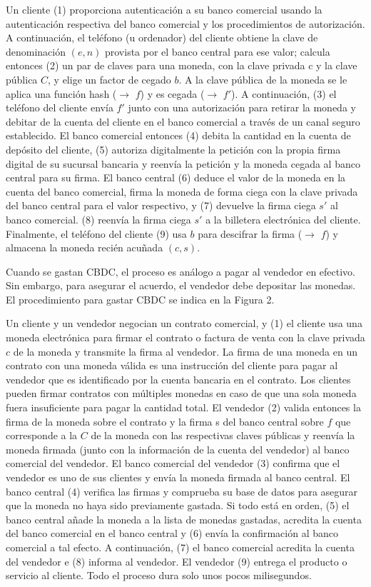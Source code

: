 \documentclass[10pt,spanish]{article}
\begin{document}
Un cliente (1) proporciona autenticación a su banco comercial usando la
autenticación respectiva del banco comercial y los procedimientos de
autorización. A continuación, el teléfono (u ordenador) del cliente
obtiene la clave de denominación $(e, n)$ provista por el banco central
para ese valor; calcula entonces (2) un par de claves para una moneda,
con la clave privada c y la clave pública $C$, y elige un factor de cegado
$b$. A la clave pública de la moneda se le aplica una función hash
($\to$ $f$) y es cegada ($\to$ $f'$). A continuación, (3) el teléfono
del cliente envía $f'$ junto con una autorización para retirar la
moneda y debitar de la cuenta del cliente en el banco comercial a través
de un canal seguro establecido. El banco comercial entonces (4) debita
la cantidad en la cuenta de depósito del cliente, (5) autoriza
digitalmente la petición con la propia firma digital de su sucursal
bancaria y reenvía la petición y la moneda cegada al banco central para
su firma. El banco central (6) deduce el valor de la moneda en la cuenta
del banco comercial, firma la moneda de forma ciega con la clave privada
del banco central para el valor respectivo, y (7) devuelve la firma
ciega $s'$ al banco comercial. (8) reenvía la firma ciega $s'$
a la billetera electrónica del cliente. Finalmente, el teléfono del
cliente (9) usa $b$ para descifrar la firma ($\to$ $f$) y almacena la
moneda recién acuñada $(c, s)$.

Cuando se gastan CBDC, el proceso es análogo a pagar al vendedor en
efectivo. Sin embargo, para asegurar el acuerdo, el vendedor debe
depositar las monedas. El procedimiento para gastar CBDC se indica en la
Figura 2.

Un cliente y un vendedor negocian un contrato comercial, y (1) el
cliente usa una moneda electrónica para firmar el contrato o factura de
venta con la clave privada $c$ de la moneda y transmite la firma al
vendedor. La firma de una moneda en un contrato con una moneda válida es
una instrucción del cliente para pagar al vendedor que es identificado
por la cuenta bancaria en el contrato. Los clientes pueden firmar
contratos con múltiples monedas en caso de que una sola moneda fuera
insuficiente para pagar la cantidad total. El vendedor (2) valida
entonces la firma de la moneda sobre el contrato y la firma s del banco
central sobre $f$ que corresponde a la $C$ de la moneda con las
respectivas claves públicas y reenvía la moneda firmada (junto con la
información de la cuenta del vendedor) al banco comercial del vendedor.
El banco comercial del vendedor (3) confirma que el vendedor es uno de
sus clientes y envía la moneda firmada al banco central. El banco
central (4) verifica las firmas y comprueba su base de datos para
asegurar que la moneda no haya sido previamente gastada. Si todo está en
orden, (5) el banco central añade la moneda a la lista de monedas
gastadas, acredita la cuenta del banco comercial en el banco central y
(6) envía la confirmación al banco comercial a tal efecto. A
continuación, (7) el banco comercial acredita la cuenta del vendedor e
(8) informa al vendedor. El vendedor (9) entrega el producto o servicio
al cliente. Todo el proceso dura solo unos pocos milisegundos.
\end{document}
